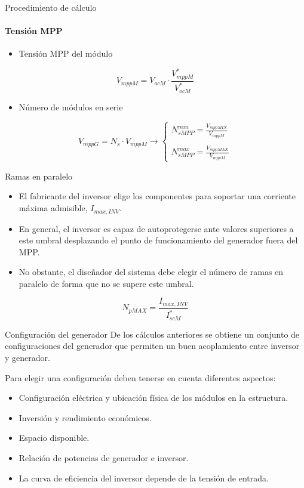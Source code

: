 \documentclass[aspectratio=169, usenames,svgnames,dvipsnames]{beamer}
\begin{document}
\begin{frame}[label={sec:org85e58e8}]{Procedimiento de cálculo}
\framesubtitle{Tensión MPP}

\begin{itemize}
\item Tensión MPP del módulo
\end{itemize}
\[
  V_{mppM} = V_{ocM} \cdot \frac{V_{mppM}^*}{V_{ocM}^*}
\]
\begin{itemize}
\item Número de módulos en serie
\end{itemize}
\[
  V_{mppG} = N_s \cdot V_{mppM} \rightarrow
  \begin{cases}
    N_{sMPP}^{min} =\frac{V_{mppMIN}}{V_{mppM}}\\
    \\
    N_{sMPP}^{max} = \frac{V_{mppMAX}}{V_{mppM}}
  \end{cases}
\]
\end{frame}
\begin{frame}[label={sec:org43b6f67}]{Ramas en paralelo}
\begin{itemize}
\item El fabricante del inversor elige los componentes para soportar una \alert{corriente máxima admisible}, \(I_{max,INV}\).

\item En general, el inversor es capaz de autoprotegerse ante valores superiores a este umbral desplazando el punto de funcionamiento del generador fuera del MPP.

\item No obstante, el diseñador del sistema debe elegir el número de ramas en paralelo de forma que no se supere este umbral.
\end{itemize}

\[
    N_{pMAX}=\frac{I_{max,INV}}{I_{scM}^{*}}
\]
\end{frame}
\begin{frame}[label={sec:org8392a4b}]{Configuración del generador}
De los cálculos anteriores se obtiene un \alert{conjunto de configuraciones} del generador que permiten un buen acoplamiento entre inversor y generador. 

Para \alert{elegir una configuración} deben tenerse en cuenta diferentes aspectos:

\begin{itemize}
\item Configuración eléctrica y ubicación física de los módulos en la
estructura.

\item Inversión y rendimiento económicos.

\item Espacio disponible.

\item Relación de potencias de generador e inversor.

\item La curva de eficiencia del inversor depende de la tensión de entrada.
\end{itemize}
\end{frame}
\end{document}
